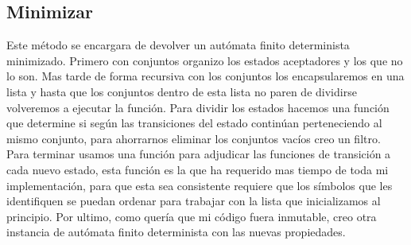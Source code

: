 \documentclass{article}
\begin{document}
    \subsection{Minimizar}
    Este método se encargara de devolver un autómata finito determinista minimizado.
    Primero con conjuntos organizo los estados aceptadores y los que no lo son.
    Mas tarde de forma recursiva con los conjuntos los encapsularemos en una lista y hasta que los conjuntos dentro de esta lista no paren de dividirse volveremos a ejecutar la función.
    Para dividir los estados hacemos una función que determine si según las transiciones del estado continúan perteneciendo al mismo conjunto, para ahorrarnos eliminar los conjuntos vacíos creo un filtro. Para terminar usamos una función para adjudicar las funciones de transición a cada nuevo estado, esta función es la que ha requerido mas tiempo de toda mi implementación, para que esta sea consistente requiere que los símbolos que les identifiquen se puedan ordenar para trabajar con la lista que inicializamos al principio.
    Por ultimo, como quería que mi código fuera inmutable, creo otra instancia de autómata  finito determinista con las nuevas propiedades.
\end{document}
